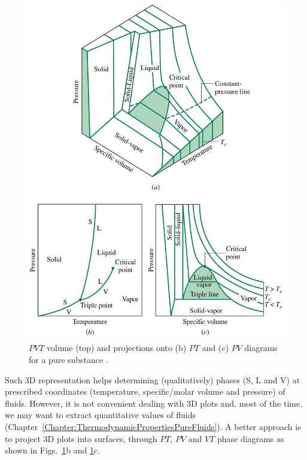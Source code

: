            \begin{figure}[h]
              \begin{center}
                 \includegraphics[width=10.cm,clip]{./Figs/PVT_Surface.jpg}
                 \caption{$PVT$ volume (top) and projections onto (b) $PT$ and (c) $PV$ diagrams for a pure substance \citep[Extracted from][]{Borgnakke_Book}.}\label{Chapter:VolumetricPropertiesPureSubstances:Fig:PVT_Surfaces}
              \end{center}
           \end{figure}    

Such 3D representation helps determining (qualitatively) phases (S, L and V) at prescribed coordinates (temperature, specific/molar volume and pressure) of fluids. However, it is not convenient dealing with 3D plots and, most of the time, we may want to extract quantitative values of fluids (Chapter~\ref{Chapter:ThermodynamicPropertiesPureFluids}). A better approach is to project 3D plots into surfaces, \ie through $PT$, $PV$ and $VT$ phase diagrams as shown in Figs.~\ref{Chapter:VolumetricPropertiesPureSubstances:Fig:PVT_Surfaces}b and \ref{Chapter:VolumetricPropertiesPureSubstances:Fig:PVT_Surfaces}c.

